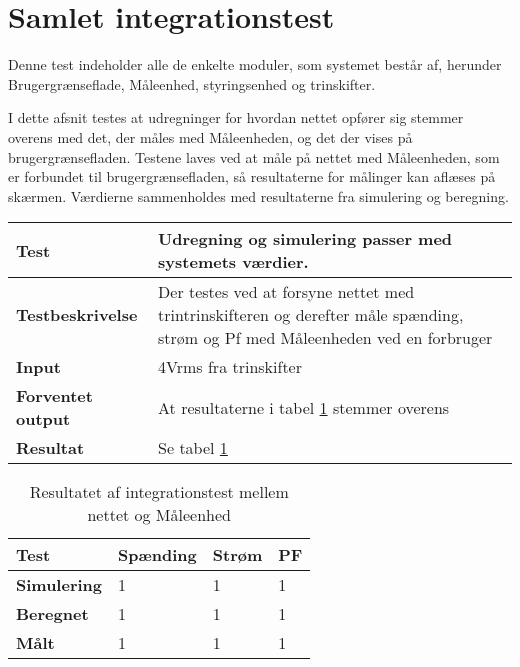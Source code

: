 
\section{Samlet integrationstest}
Denne test indeholder alle de enkelte moduler, som systemet består af, herunder Brugergrænseflade, Måleenhed, styringsenhed og trinskifter. 

I dette afsnit testes at udregninger for hvordan nettet opfører sig stemmer overens med det, der måles med Måleenheden, og det der vises på brugergrænsefladen.
Testene laves ved at måle på nettet med Måleenheden, som er forbundet til brugergrænsefladen, så resultaterne for målinger kan aflæses på skærmen. Værdierne sammenholdes med resultaterne fra simulering og beregning. 



\begin{center}
	\begin{tabular}{ | m{} | m{}|} 
		\hline
		\textbf{Test}					&Udregning og simulering passer med systemets værdier. \\ \hline
		\textbf{Testbeskrivelse}		&Der testes ved at forsyne nettet med trintrinskifteren og derefter måle spænding, strøm og Pf med Måleenheden ved en forbruger \\ \hline
		\textbf{Input}					&4Vrms fra trinskifter \\ \hline
		\textbf{Forventet output}		&At resultaterne i tabel \ref{tab:intTest2} stemmer overens \\ \hline
		\textbf{Resultat}				&Se tabel \ref{tab:intTest2} \\ \hline
	\end{tabular}
\end{center}


\begin{table}[H]
	\begin{tabular}{ | m{} | m{} | m{} | m{}|}  
		\hline
		\textbf{Test}			& \textbf{Spænding} & \textbf{Strøm}  	& \textbf{PF}			\\ \hline
		\textbf{Simulering}		&1					&1				  	&1 					\\ \hline
		\textbf{Beregnet}		&1 					&1					&1					\\ \hline
		\textbf{Målt}			&1 					&1					&1					\\ \hline
	\end{tabular}
	\caption{Resultatet af integrationstest mellem nettet og Måleenhed}
	\label{tab:intTest2}
\end{table}
